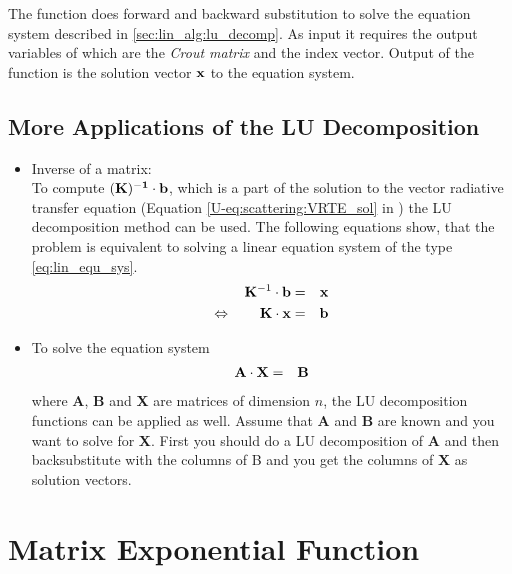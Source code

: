 The function  does forward and backward
substitution to solve the equation system described in
\ref{sec:lin_alg:lu_decomp}. As input it requires the output variables of
 which are the {\sl Crout matrix} and the index
vector. Output of the function is the solution vector ${\bf x}$ to the
equation system.


\subsection{More Applications of the LU Decomposition}
\label{lu_applications}

\begin{itemize}
\item Inverse of a matrix:\\
  To compute $(\bf K)^{-1}\cdot{\bf b}$, which is a part of the
solution to the vector radiative transfer equation (Equation
\ref{U-eq:scattering:VRTE_sol} in \user) the LU
decomposition method can be used. The following equations show, that
the problem is equivalent to  solving a linear equation system of the type
\ref{eq:lin_equ_sys}.
\begin{eqnarray}
  {\bf K}^{-1}\cdot{\bf b} &=& {\bf x}\\
\Leftrightarrow \qquad  {\bf K}\cdot{\bf x} &=& {\bf b}
\end{eqnarray}

\item To solve the equation system
  \begin{eqnarray}
    {\bf A}\cdot{\bf X} &=& {\bf B}
  \end{eqnarray}
where {\bf A}, {\bf B} and  {\bf X} are matrices of dimension
$n$, the LU decomposition functions can be applied as well. Assume
that {\bf A} and {\bf B} are known and you want to solve for {\bf
 X}.
First you should do a LU decomposition of  {\bf A} and then
backsubstitute with the columns of B and you get the columns of {\bf
  X} as solution vectors.

\end{itemize}

\section{Matrix Exponential Function}
\label{sec:lin_alg:mat_exp}

